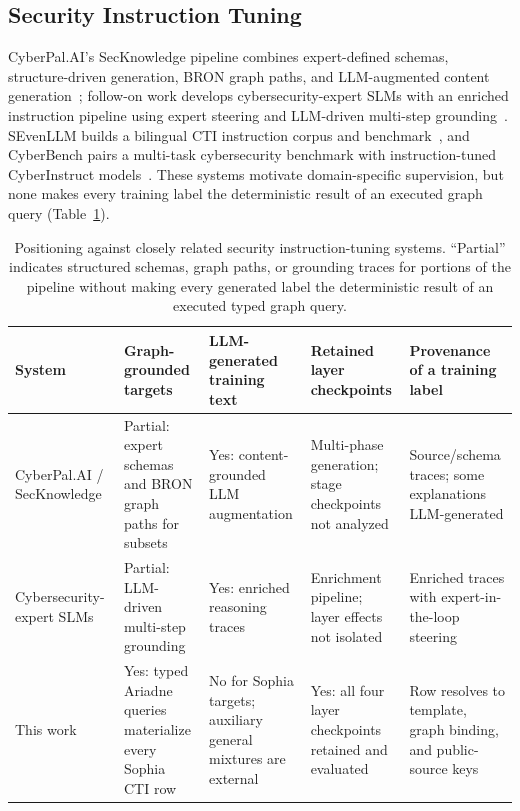 \documentclass[conference]{IEEEtran}
\begin{document}
\subsection{Security Instruction Tuning}
CyberPal.AI's SecKnowledge pipeline combines expert-defined schemas, structure-driven generation, BRON graph paths, and LLM-augmented content generation~\cite{levi2025cyberpal}; follow-on work develops cybersecurity-expert SLMs with an enriched instruction pipeline using expert steering and LLM-driven multi-step grounding~\cite{levi2025slm}. SEvenLLM builds a bilingual CTI instruction corpus and benchmark~\cite{ji2024sevenllm}, and CyberBench pairs a multi-task cybersecurity benchmark with instruction-tuned CyberInstruct models~\cite{liu2024cyberbench}. These systems motivate domain-specific supervision, but none makes every training label the deterministic result of an executed graph query (Table~\ref{tab:related}).

\begin{table}[t]
\caption{Positioning against closely related security instruction-tuning systems. ``Partial'' indicates structured schemas, graph paths, or grounding traces for portions of the pipeline without making every generated label the deterministic result of an executed typed graph query.}
\label{tab:related}
\centering
\scriptsize
\setlength{\tabcolsep}{3pt}
\begin{tabular}{@{}p{}p{}p{}p{}p{}@{}}
\toprule
System & Graph-grounded targets & LLM-generated training text & Retained layer checkpoints & Provenance of a training label \\
\midrule
CyberPal.AI / SecKnowledge~\cite{levi2025cyberpal} & Partial: expert schemas and BRON graph paths for subsets & Yes: content-grounded LLM augmentation & Multi-phase generation; stage checkpoints not analyzed & Source/schema traces; some explanations LLM-generated \\
Cybersecurity-expert SLMs~\cite{levi2025slm} & Partial: LLM-driven multi-step grounding & Yes: enriched reasoning traces & Enrichment pipeline; layer effects not isolated & Enriched traces with expert-in-the-loop steering \\
This work & Yes: typed Ariadne queries materialize every Sophia CTI row & No for Sophia targets; auxiliary general mixtures are external & Yes: all four layer checkpoints retained and evaluated & Row resolves to template, graph binding, and public-source keys \\
\bottomrule
\end{tabular}
\end{table}
\end{document}
